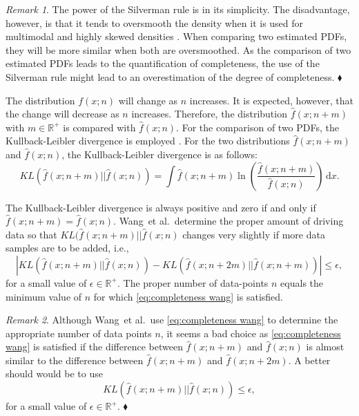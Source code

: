 \documentclass[10pt,final,a4paper,oneside,onecolumn]{article}
\newcommand*{\ud}{\mathrm{\,d}}                                 %
\newcommand*{\etal}{et al.}                                     %
\theoremstyle{plain}\newtheorem{definition}{Definition}[section]    %
\theoremstyle{definition}\newtheorem{example}{Example}[section]     %
\theoremstyle{remark}\newtheorem{remarkenv}{Remark}[section]        %
\newenvironment{remark}{\begin{remarkenv}}%
                       {\hfill$\blacklozenge$\end{remarkenv}}       %
\begin{document}
\begin{remark}
	The power of the Silverman rule is in its simplicity. The disadvantage, however, is that it tends to oversmooth the density when it is used for multimodal and highly skewed densities \cite{silverman1986density}. When comparing two estimated PDFs, they will be more similar when both are oversmoothed. As the comparison of two estimated PDFs leads to the quantification of completeness, the use of the Silverman rule might lead to an overestimation of the degree of completeness.
\end{remark}

The distribution $f(x;n)$ will change as $n$ increases. It is expected, however, that the change will decrease as $n$ increases. Therefore, the distribution $\hat{f}(x;n+m)$ with $m \in \mathds{R}^+$ is compared with $\hat{f}(x;n)$. For the comparison of two PDFs, the Kullback-Leibler divergence is employed \cite{kullback1951, bishop2006pattern}. For the two distributions $\hat{f}(x;n+m)$ and $\hat{f}(x;n)$, the Kullback-Leibler divergence is as follows:
\begin{equation} \label{eq:KL divergence}
	KL\left( \hat{f}(x;n+m) || \hat{f}(x;n) \right) = \int \hat{f}(x;n+m) \ln \left( \frac{\hat{f}(x;n+m)}{\hat{f}(x;n)} \right) \ud x.
\end{equation}

The Kullback-Leibler divergence is always positive and zero if and only if $\hat{f}(x;n+m) = \hat{f}(x;n)$. Wang~\etal\ determine the proper amount of driving data so that $KL(\hat{f}(x;n+m)||\hat{f}(x;n)$ changes very slightly if more data samples are to be added, i.e.,
\begin{equation} \label{eq:completeness wang}
	\left| KL\left(\hat{f}(x;n+m)||\hat{f}(x;n)\right) - KL\left(\hat{f}(x;n+2m)||\hat{f}(x;n+m)\right) \right| \leq \epsilon,
\end{equation}
for a small value of $\epsilon\in\mathds{R}^+$. The proper number of data-points $n$ equals the minimum value of $n$ for which \cref{eq:completeness wang} is satisfied.

\begin{remark}
	Although Wang~\etal\ use \cref{eq:completeness wang} to determine the appropriate number of data points $n$, it seems a bad choice as \cref{eq:completeness wang} is satisfied if the difference between $\hat{f}(x;n+m)$ and $\hat{f}(x;n)$ is almost similar to the difference between $\hat{f}(x;n+m)$ and $\hat{f}(x;n+2m)$. A better should would be to use
	\begin{equation} \label{eq:kl epsilon}
		KL\left(\hat{f}(x;n+m) || \hat{f}(x;n) \right) \leq \epsilon,
	\end{equation}
	for a small value of $\epsilon\in\mathds{R}^+$.
\end{remark}
\end{document}
